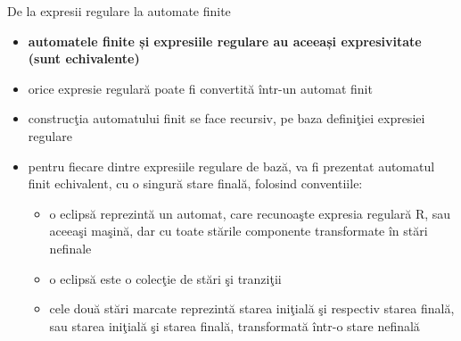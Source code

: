 \documentclass[pdf]{beamer}
\begin{document}
\begin{frame}{De la expresii regulare la automate finite }
\begin{itemize}
\item
\textbf{automatele finite și expresiile regulare au aceeași expresivitate (sunt echivalente)}
\item
orice expresie regulară poate fi convertită într-un automat finit
\item
construcţia automatului finit se face recursiv, pe baza definiţiei expresiei regulare
\item
pentru fiecare dintre expresiile regulare de bază, va fi prezentat automatul finit echivalent, cu o singură stare finală, folosind conventiile:
\begin{itemize}
\item
o eclipsă reprezintă un automat, care recunoaşte expresia regulară R, sau aceeaşi maşină, dar cu toate stările componente transformate în stări nefinale
\item
o eclipsă este o colecţie de stări şi tranziţii
\item
cele două stări marcate reprezintă starea iniţială şi respectiv starea finală, sau starea iniţială şi starea finală, transformată într-o stare nefinală
\end{itemize}
\end{itemize}
\end{frame}
\end{document}
